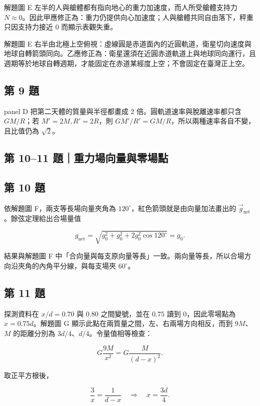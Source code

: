 \documentclass[11pt,a4paper]{article}
\begin{document}
解題圖 E 左半的人與艙體都有指向地心的重力加速度，而人所受艙體支持力 \(N\approx0\)。因此甲應修正為：重力仍提供向心加速度；人與艙體共同自由落下，秤重只因支持力接近 0 而顯示表觀失重。

解題圖 E 右半由北極上空俯視：虛線圓是赤道面內的近圓軌道，衛星切向速度與地球自轉箭頭同向。乙應修正為：衛星還須在近圓赤道軌道上與地球同向運行，且週期等於地球自轉週期，才能固定在赤道某經度上空；不會固定在臺灣正上空。

\subsection{第 9 題}\label{ux7b2c-9-ux984c}

panel D 把第二天體的質量與半徑都畫成 2 倍。圓軌道速率與脫離速率都只含 \(GM/R\)；若 \(M'=2M,R'=2R\)，則 \(GM'/R'=GM/R\)，所以兩種速率各自不變，且比值仍為 \(\sqrt2\)。

\subsection{第 10--11 題｜重力場向量與零場點}\label{ux7b2c-1011-ux984cux91cdux529bux5834ux5411ux91cfux8207ux96f6ux5834ux9ede}

\subsection{第 10 題}\label{ux7b2c-10-ux984c}

依解題圖 F，兩支等長場向量夾角為 \(120^\circ\)，紅色箭頭就是由向量加法畫出的 \(\vec g_{\mathrm{net}}\)。餘弦定理給出合場量值

\[
g_{\mathrm{net}}
=\sqrt{g_0^2+g_0^2+2g_0^2\cos120^\circ}
=g_0.
\]

結果與解題圖 F 中「合向量與每支原向量等長」一致。兩向量等長，所以合場方向沿夾角的內角平分線，與每支場夾 \(60^\circ\)。

\subsection{第 11 題}\label{ux7b2c-11-ux984c}

探測資料在 \(x/d=0.70\) 與 \(0.80\) 之間變號，並在 \(0.75\) 讀到 0，因此零場點為 \(x=0.75d\)。解題圖 G 顯示此點在兩質量之間，左、右兩場方向相反，而到 \(9M\)、\(M\) 的距離分別為 \(3d/4\)、\(d/4\)。令量值相等檢查：

\[
G\frac{9M}{x^2}=G\frac{M}{(d-x)^2}.
\]

取正平方根後，

\[
\frac3x=\frac1{d-x}
\quad\Rightarrow\quad
x=\frac{3d}{4}.
\]
\end{document}
